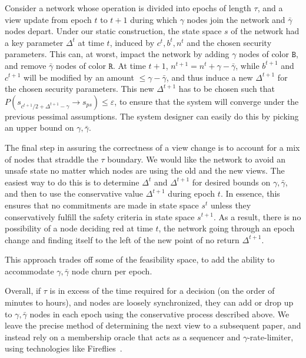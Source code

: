 \documentclass[letterpaper,twocolumn,10pt]{article}
\newcommand{\tronly}[2]{#1}
\theoremstyle{definition}
\begin{document}
\begin{appendices}
Consider a network whose operation is divided into epochs of length $\tau$, and a view update from epoch $t$ to $t+1$ during which $\gamma$ nodes join the network and $\bar \gamma$ nodes depart.
Under our static construction, the state space $s$ of the network had a key parameter $\Delta^{t}$ at time $t$, induced by $c^{t}, b^{t}, n^{t}$ and the chosen security parameters.
This can, at worst, impact the network by adding $\gamma$ nodes of color $\mathtt{B}$, and remove $\bar \gamma$ nodes of color $\mathtt{R}$.
At time $t+1$, $n^{t+1} = n^{t} + \gamma - {\bar \gamma}$, while $b^{t+1}$ and $c^{t+1}$ will be modified by an amount $\leq \gamma - {\bar \gamma}$, and thus induce a new $\Delta^{t+1}$ for the chosen security parameters.
This new $\Delta^{t+1}$ has to be chosen such that $P(s_{c^{t+1}/2 + \Delta^{t+1} - \gamma} \rightarrow s_{ps}) \leq \varepsilon$, to ensure that the system will converge under the previous pessimal assumptions. The system designer can easily do this by picking an upper bound on $\gamma, \bar \gamma$.

The final step in assuring the correctness of a view change is to account for a mix of nodes that straddle the $\tau$ boundary. We would like the network to avoid an unsafe state no matter which nodes are using the old and the new views.
The easiest way to do this is to determine $\Delta^t$ and $\Delta^{t+1}$ for desired bounds on $\gamma, \bar \gamma$, and then to use the conservative value $\Delta^{t+1}$ during epoch $t$. In essence, this ensures that no commitments are made in state space $s^t$ unless they conservatively fulfill the safety criteria in state space $s^{t+1}$. As a result, there is no possibility of a node deciding red at time $t$, the network going through an epoch change and finding itself to the left of the new point of no return $\Delta^{t+1}$.

This approach trades off some of the feasibility space, to add the ability to accommodate $\gamma, \bar \gamma$ node churn per epoch.
\tronly{
Overall, if $\tau$ is in excess of the time required for a decision (on the order of minutes to hours), and nodes are loosely synchronized,
they can add or drop up to $\gamma, \bar \gamma$ nodes in each epoch using the conservative process described above. }{}
We leave the precise method of determining the next view to a subsequent paper, and instead
rely on a membership oracle that acts as a sequencer and $\gamma$-rate-limiter, using technologies like Fireflies~\cite{JohansenRVJ15}.
\end{appendices}
\end{document}
